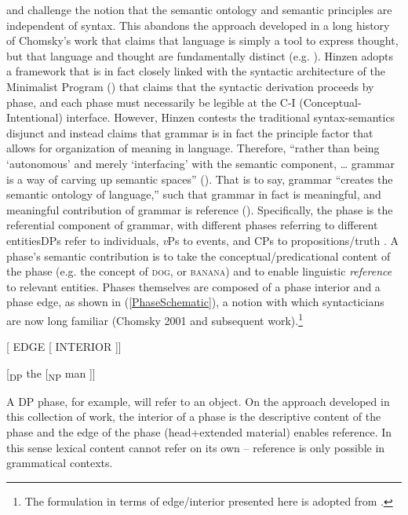 \citet{Hinzen:2006, Hinzen:2012} and \citet{HinzenSheehan:2013} challenge the notion that the semantic ontology and semantic principles are independent of syntax. This abandons the approach developed in a long history of Chomsky’s work that claims that language is simply a tool to express thought, but that language and thought are fundamentally distinct (e.g. \citealt{Chomsky:2000b}). Hinzen adopts a framework that is in fact closely linked with the syntactic architecture of the Minimalist Program (\citealt{Chomsky:2000a,Chomsky:2001,Chomsky:2008}) that claims that the syntactic derivation proceeds by phase, and each phase must necessarily be legible at the C-I (Conceptual-Intentional) interface. However, Hinzen contests the traditional syntax-semantics disjunct and instead claims that grammar is in fact the principle factor that allows for organization of meaning in language. Therefore, ``rather than being `autonomous' and merely `interfacing' with the semantic component, … grammar is a way of carving up semantic spaces'' (\citealt[311]{Hinzen:2012}).  That is to say, grammar ``creates the semantic ontology of language,'' such that grammar in fact is meaningful, and meaningful contribution of grammar is reference (\citealt[311]{Hinzen:2012}). Specifically, the phase is the referential component of grammar, with different phases referring to different entities\textemdash DPs refer to individuals, \textit{v}Ps to events, and CPs to propositions/truth \citep{HinzenSheehan:2013, SheehanHinzen:2011}.  
A phase's semantic contribution is to take the conceptual/predicational content of the phase (e.g. the concept of \textsc{dog}, or \textsc{banana}) and to enable linguistic \textit{reference} to relevant entities. Phases themselves are composed of a phase interior and a phase edge, as shown in (\ref{PhaseSchematic}), a notion with which syntacticians are now long familiar (Chomsky 2001 and subsequent work).\footnote{The formulation in terms of edge/interior presented here is adopted from \citet{HinzenSheehan:2013}.} 

\ea	 \label{PhaseSchematic}
{[} EDGE [ INTERIOR ]]
\z

\ea 
{[}\textsubscript{DP} the [\textsubscript{NP} man ]]
\z

\noindent A DP phase, for example, will refer to an object. On the approach developed in this collection of work, the interior of a phase is the descriptive content of the phase and the edge of the phase (head+extended material) enables reference. In this sense lexical content cannot refer on its own – reference is only possible in grammatical contexts. 

